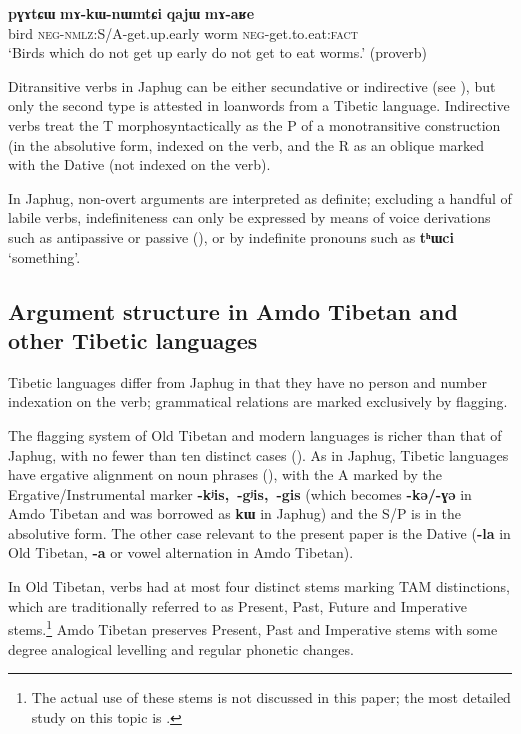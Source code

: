 \documentclass[oneside,a4paper,11pt]{article}
\newcommand{\ipa}[1]{{\phon\textbf{\mbox{#1}}}} %
\begin{document}
\begin{exe}
\ex \label{ex:maRe}
\gll
\ipa{pɣɤtɕɯ}  	\ipa{mɤ-kɯ-nɯmtɕi}  	\ipa{qajɯ}  	\ipa{mɤ-aʁe}  \\
bird \textsc{neg-nmlz}:S/A-get.up.early worm \textsc{neg}-get.to.eat:\textsc{fact} \\
\glt `Birds which do not get up early do not get to eat worms.' (proverb) 
\end{exe}  

Ditransitive verbs in Japhug can be either secundative or indirective (see \citealt{jacques14antipassive}), but only the second type is attested in loanwords from a Tibetic language. Indirective verbs treat the T morphosyntactically as the P of a monotransitive construction (in the absolutive form, indexed on the verb, and the R as an oblique marked with the Dative (not indexed on the verb).

In Japhug, non-overt arguments are interpreted as definite; excluding a handful of labile verbs, indefiniteness can only be expressed by means of voice derivations such as antipassive or passive (\citealt{jacques12demotion}), or by indefinite pronouns such as \ipa{tʰɯci} `something'.

\subsection{Argument structure in Amdo Tibetan and other Tibetic languages}
Tibetic languages differ from Japhug in that they have no person and number indexation on the verb; grammatical relations are marked exclusively by flagging.

The flagging system of Old Tibetan and modern languages is richer than that of Japhug,  with no fewer than ten distinct cases (\citealt{tournadre10cases, hill12bas}). As in Japhug, Tibetic languages have ergative alignment on noun phrases (\citealt{tournadre96erg}), with the A marked by the Ergative/Instrumental marker \ipa{-kʲis, -gʲis, -gis} (which becomes \ipa{-kə/-ɣə} in Amdo Tibetan and was borrowed as \ipa{kɯ} in Japhug) and the S/P is in the absolutive form. The other case relevant to the present paper is the Dative (\ipa{-la} in Old Tibetan, \ipa{-a} or vowel alternation in Amdo Tibetan).


In Old Tibetan, verbs had at most four distinct stems marking TAM distinctions, which are traditionally referred to as Present, Past, Future and Imperative stems.\footnote{The actual use of these stems is not discussed in this paper; the most detailed study on this topic is \citet{zeisler04}.} Amdo Tibetan preserves Present, Past and Imperative stems with some degree analogical levelling and regular phonetic changes.
\end{document}
